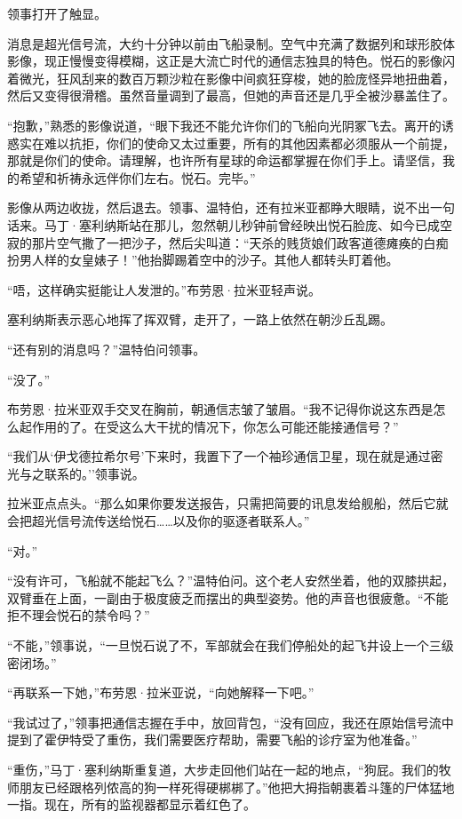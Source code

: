 \documentclass[AutoFakeBold=true]{book}
\begin{document}
领事打开了触显。

消息是超光信号流，大约十分钟以前由飞船录制。空气中充满了数据列和球形胶体影像，现正慢慢变得模糊，这正是大流亡时代的通信志独具的特色。悦石的影像闪着微光，狂风刮来的数百万颗沙粒在影像中间疯狂穿梭，她的脸庞怪异地扭曲着，然后又变得很滑稽。虽然音量调到了最高，但她的声音还是几乎全被沙暴盖住了。

``抱歉，''熟悉的影像说道，``眼下我还不能允许你们的飞船向光阴冢飞去。离开的诱惑实在难以抗拒，你们的使命又太过重要，所有的其他因素都必须服从一个前提，那就是你们的使命。请理解，也许所有星球的命运都掌握在你们手上。请坚信，我的希望和祈祷永远伴你们左右。悦石。完毕。''

影像从两边收拢，然后退去。领事、温特伯，还有拉米亚都睁大眼睛，说不出一句话来。马丁·塞利纳斯站在那儿，忽然朝儿秒钟前曾经映出悦石脸庞、如今已成空寂的那片空气撒了一把沙子，然后尖叫道：``天杀的贱货娘们政客道德瘫痪的白痴扮男人样的女皇婊子！''他抬脚踢着空中的沙子。其他人都转头盯着他。

``唔，这样确实挺能让人发泄的。''布劳恩·拉米亚轻声说。

塞利纳斯表示恶心地挥了挥双臂，走开了，一路上依然在朝沙丘乱踢。

``还有别的消息吗？''温特伯问领事。

``没了。''

布劳恩·拉米亚双手交叉在胸前，朝通信志皱了皱眉。``我不记得你说这东西是怎么起作用的了。在受这么大干扰的情况下，你怎么可能还能接通信号？''

``我们从`伊戈德拉希尔号'下来时，我置下了一个袖珍通信卫星，现在就是通过密光与之联系的。''领事说。

拉米亚点点头。``那么如果你要发送报告，只需把简要的讯息发给舰船，然后它就会把超光信号流传送给悦石……以及你的驱逐者联系人。''

``对。''

``没有许可，飞船就不能起飞么？''温特伯问。这个老人安然坐着，他的双膝拱起，双臂垂在上面，一副由于极度疲乏而摆出的典型姿势。他的声音也很疲惫。``不能拒不理会悦石的禁令吗？''

``不能，''领事说，``一旦悦石说了不，军部就会在我们停船处的起飞井设上一个三级密闭场。''

``再联系一下她，''布劳恩·拉米亚说，``向她解释一下吧。''

``我试过了，''领事把通信志握在手中，放回背包，``没有回应，我还在原始信号流中提到了霍伊特受了重伤，我们需要医疗帮助，需要飞船的诊疗室为他准备。''

``重伤，''马丁·塞利纳斯重复道，大步走回他们站在一起的地点，``狗屁。我们的牧师朋友已经跟格列侬高的狗一样死得硬梆梆了。''他把大拇指朝裹着斗篷的尸体猛地一指。现在，所有的监视器都显示着红色了。
\end{document}
